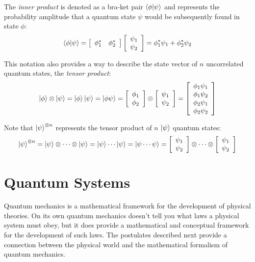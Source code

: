 The \textit{inner product} is denoted as a bra-ket pair $\left\langle{\phi}|{\psi}\right\rangle$ and represents the probability amplitude that a quantum state $\psi$ would be subsequently found in state $\phi$:
$$\left\langle{\phi}|{\psi}\right\rangle=\left[\begin{array}{cc}\phi_{1}^{*} & \phi_{2}^{*} \end{array}\right]\left[\begin{array}{c}\psi_{1} \\ \psi_{2} \end{array}\right]=\phi_{1}^{*}\psi_{1}+\phi_{2}^{*}\psi_{2}$$

This notation also provides a way to describe the state vector of $n$ uncorrelated quantum states, the \textit{tensor product}:
$$\left|{\phi}\right\rangle\otimes\left|{\psi}\right\rangle=\left|{\phi}\right\rangle\left|{\psi}\right\rangle=\left|{\phi\psi}\right\rangle=\left[\begin{array}{c}\phi_{1} \\ \phi_{2}\end{array}\right]\otimes\left[\begin{array}{c}\psi_{1} \\ \psi_{2}\end{array}\right]=\left[\begin{array}{c}\phi_{1}\psi_{1} \\ \phi_{1}\psi_{2} \\ \phi_{2}\psi_{1} \\ \phi_{2}\psi_{2}\end{array}\right]$$

Note that $\left|{\psi}\right\rangle^{\otimes n}$ represents the tensor product of $n$ $\left|{\psi}\right\rangle$ quantum states:
$$\left|{\psi}\right\rangle^{\otimes n}=\left|{\psi}\right\rangle\otimes\cdots\otimes\left|{\psi}\right\rangle=\left|{\psi}\right\rangle\cdots\left|{\psi}\right\rangle=\left|{\psi\cdots\psi}\right\rangle=\left[\begin{array}{c}\psi_{1} \\ \psi_{2} \end{array}\right]\otimes\cdots\otimes\left[\begin{array}{c}\psi_{1} \\ \psi_{2} \end{array}\right]$$

\section{Quantum Systems}

Quantum mechanics is a mathematical framework for the development of physical theories\cite{NielsenChuang_2012}. On its own quantum mechanics doesn't tell you what laws a physical system must obey, but it does provide a mathematical and conceptual framework for the development of such laws. The postulates described next provide a connection between the physical world and the mathematical formalism of quantum mechanics.

